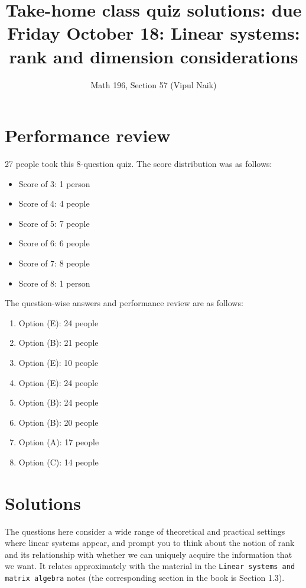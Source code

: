 \documentclass[10pt]{amsart}
\title{Take-home class quiz solutions: due Friday October 18: Linear systems: rank and dimension considerations}
\author{Math 196, Section 57 (Vipul Naik)}
\begin{document}
\maketitle

\section{Performance review}

27 people took this 8-question quiz. The score distribution was as
follows:

\begin{itemize}
\item Score of 3: 1 person
\item Score of 4: 4 people
\item Score of 5: 7 people
\item Score of 6: 6 people
\item Score of 7: 8 people
\item Score of 8: 1 person
\end{itemize}

The question-wise answers and performance review are as follows:

\begin{enumerate}
\item Option (E): 24 people
\item Option (B): 21 people
\item Option (E): 10 people
\item Option (E): 24 people
\item Option (B): 24 people
\item Option (B): 20 people
\item Option (A): 17 people
\item Option (C): 14 people
\end{enumerate}

\section{Solutions}

The questions here consider a wide range of theoretical and practical
settings where linear systems appear, and prompt you to think about
the notion of rank and its relationship with whether we can uniquely
acquire the information that we want. It relates approximately with
the material in the {\tt Linear systems and matrix algebra} notes (the
corresponding section in the book is Section 1.3).
\end{document}
